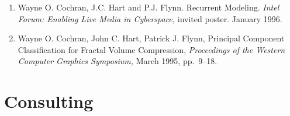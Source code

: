 \documentclass[10pt]{article}
\begin{document}
\begin{enumerate}
\item
Wayne O. Cochran, J.C. Hart and P.J. Flynn. Recurrent Modeling. 
{\em Intel Forum: Enabling Live Media in Cyberspace,} 
invited poster. January 1996.

\item
Wayne O. Cochran, John C. Hart, Patrick J. Flynn,
Principal Component Classification for Fractal Volume Compression,
{\em Proceedings of the Western Computer Graphics Symposium,}
March 1995, \mbox{pp.~9--18}.

\end{enumerate}




\section*{Consulting}
\end{document}
